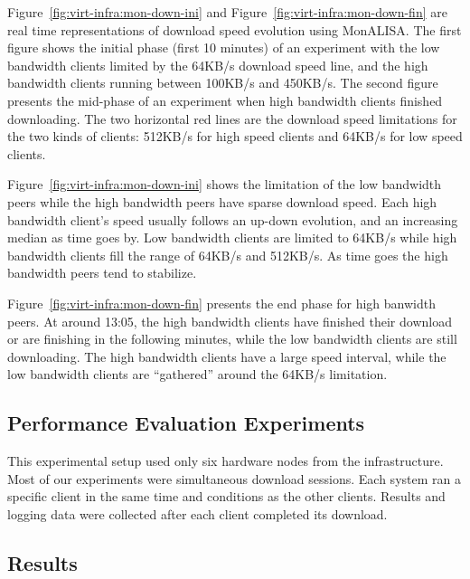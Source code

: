 Figure~\ref{fig:virt-infra:mon-down-ini} and
Figure~\ref{fig:virt-infra:mon-down-fin} are real time representations of
download speed evolution using MonALISA. The first figure shows the initial
phase (first 10 minutes) of an experiment with the low bandwidth clients
limited by the 64KB/s download speed line, and the high bandwidth clients
running between 100KB/s and 450KB/s. The second figure presents the mid-phase
of an experiment when high bandwidth clients finished downloading. The two
horizontal red lines are the download speed limitations for the two kinds of
clients: 512KB/s for high speed clients and 64KB/s for low speed clients.

Figure~\ref{fig:virt-infra:mon-down-ini} shows the limitation of the low
bandwidth peers while the high bandwidth peers have sparse download speed.
Each high bandwidth client's speed usually follows an up-down evolution, and
an increasing median as time goes by. Low bandwidth clients are limited to
64KB/s while high bandwidth clients fill the range of 64KB/s and 512KB/s. As
time goes the high bandwidth peers tend to stabilize.

Figure~\ref{fig:virt-infra:mon-down-fin} presents the end phase for high
banwidth peers.  At around 13:05, the high bandwidth clients have finished
their download or are finishing in the following minutes, while the low
bandwidth clients are still downloading. The high bandwidth clients have a
large speed interval, while the low bandwidth clients are ``gathered'' around
the 64KB/s limitation.

\subsection{Performance Evaluation Experiments}

This experimental setup used only six hardware nodes from the infrastructure.
Most of our experiments were simultaneous download sessions. Each system ran a
specific client in the same time and conditions as the other clients. Results
and logging data were collected after each client completed its download.

\subsection{Results}

